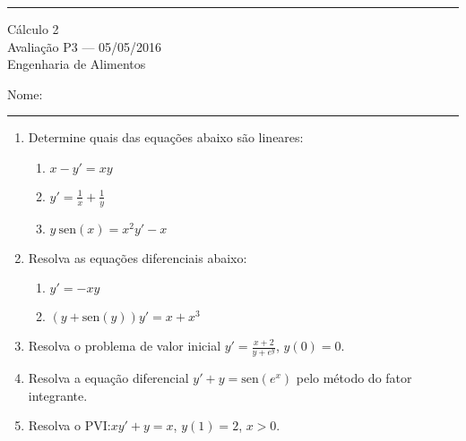 \documentclass{article}
\newcommand{\ds}{\displaystyle}
\newcommand{\sen}{\mbox{sen}}
\begin{document}
\noindent{}\rule{\textwidth}{0.4pt}
\begin{center}
	C\'alculo 2\\
	Avalia\c{c}\~ao P3 --- 05/05/2016 \\
	Engenharia de Alimentos \\
	\vspace{0.2cm}
\end{center}
Nome: \\
\noindent{}\rule{\textwidth}{0.4pt}

\begin{enumerate}
\item Determine quais das equa\c{c}\~oes abaixo s\~ao lineares:
	\begin{enumerate}
		\item $\ds x-y' = xy$
		\item $\ds y' = \frac{1}{x} + \frac{1}{y}$
		\item $\ds y\ \sen(x) = x^2y' - x$
	\end{enumerate}

\item Resolva as equa\c{c}\~oes diferenciais abaixo:
	\begin{enumerate}
		\item $y' = -xy$
		\item $(y+\sen(y))y'=x+x^3$
	\end{enumerate}

\item Resolva o problema de valor inicial $\ds y' = \frac{x+2}{y+e^y}$, $y(0)=0$.

\item Resolva a equa\c{c}\~ao diferencial $y'+y=\sen(e^x)$ pelo m\'etodo do fator integrante.

\item Resolva o PVI:\@ $xy'+y = x$, $y(1)=2$, $x>0$.

\end{enumerate}
\end{document}
